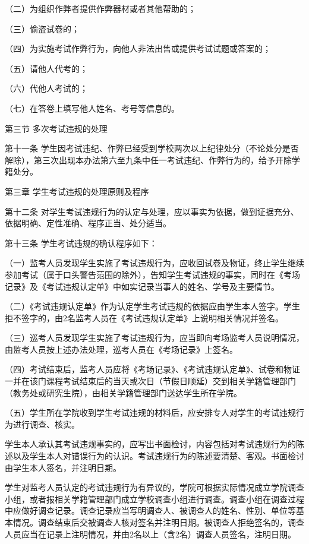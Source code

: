 \documentclass[UTF8,12pt,a4paper]{report}
\begin{document}
（二）为组织作弊者提供作弊器材或者其他帮助的；

（三）偷盗试卷的；

（四）为实施考试作弊行为，向他人非法出售或提供考试试题或答案的；

（五）请他人代考的；

（六）代他人考试的；

（七）在答卷上填写他人姓名、考号等信息的。

第三节  多次考试违规的处理

第十一条  学生因考试违纪、作弊已经受到学校两次以上纪律处分（不论处分是否解除），第三次出现本办法第六至九条中任一考试违纪、作弊行为的，给予开除学籍处分。



第三章  学生考试违规的处理原则及程序

第十二条  对学生考试违规行为的认定与处理，应以事实为依据，做到证据充分、依据明确、定性准确、程序正当、处分适当。

第十三条  学生考试违规的确认程序如下：

（一）监考人员发现学生实施了考试违规行为，应收回试卷及物证，终止学生继续参加考试（属于口头警告范围的除外），告知学生考试违规的事实，同时在《考场记录》及《考试违规认定单》中如实记录当事人的姓名、学号及主要情节。

（二）《考试违规认定单》作为认定学生考试违规的依据应由学生本人签字。学生拒不签字的，由2名监考人员在《考试违规认定单》上说明相关情况并签名。

（三）巡考人员发现学生实施了考试违规行为，应当即向考场监考人员说明情况，由监考人员按上述办法处理，巡考人员在《考场记录》上签名。

（四）考试结束后，监考人员应将《考场记录》、《考试违规认定单》、试卷和物证一并在该门课程考试结束后的当天或次日（节假日顺延）交到相关学籍管理部门（教务处或研究生院），由相关学籍管理部门送达学生所在学院。

（五）学生所在学院收到学生考试违规的材料后，应安排专人对学生的考试违规行为进行调查、核实。

学生本人承认其考试违规事实的，应写出书面检讨，内容包括对考试违规行为的陈述以及学生本人对错误行为的认识。考试违规行为的陈述要清楚、客观。书面检讨由学生本人签名，并注明日期。

学生对监考人员认定的考试违规行为有异议的，学院可根据实际情况成立学院调查小组，或者报相关学籍管理部门成立学校调查小组进行调查。调查小组在调查过程中应做好调查记录。调查记录应当写明调查人、被调查人的姓名、性别、单位等基本情况。调查结束后交被调查人核对签名并注明日期。被调查人拒绝签名的，调查人员应当在记录上注明情况，并由2名以上（含2名）调查人员签名，注明日期。
\end{document}
